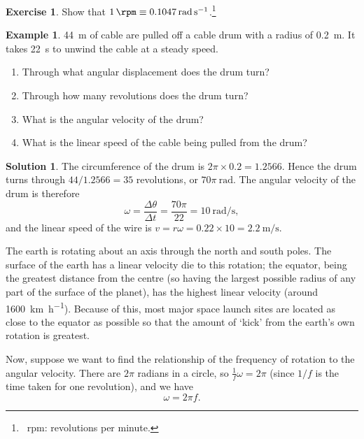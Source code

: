 \documentclass[a4paper]{amsbook}
\theoremstyle{definition}
\newtheorem*{example}{Example}
\newtheorem{exercise}{Exercise}
\numberwithin{exercise}{chapter}
\numberwithin{exercise}{chapter}
\newtheorem*{solution}{Solution}
\begin{document}
\begin{exercise}
  Show that $ \SI{1}{\rpm} \equiv \SI{0.1047}{\radian\per\second} $.\footnote{~rpm: revolutions per minute.}
\end{exercise}

\begin{example}
  \SI{44}{\metre} of cable are pulled off a cable drum with a radius of \SI{0.2}{\metre}. It takes \SI{22}{\second} to unwind
  the cable at a steady speed.
  \begin{enumerate}
    \item Through what angular displacement does the drum turn?
    \item Through how many revolutions does the drum turn?
    \item What is the angular velocity of the drum?
    \item What is the linear speed of the cable being pulled from the drum?
  \end{enumerate}
\end{example}
\begin{solution}
  The circumference of the drum is $ 2\pi \times 0.2 = 1.2566 $. Hence the drum turns through $ 44/1.2566 = 35 $ revolutions,
  or $ 70\pi~\si{\radian} $. The angular velocity of the drum is therefore
  \begin{displaymath}
    \omega = \frac{\Delta \theta}{\Delta t} = \frac{70\pi}{22} = \SI{10}{\radian\per\second},
  \end{displaymath}
  and the linear speed of the wire is $ v = r\omega = 0.22 \times 10 = \SI{2.2}{\metre\per\second} $.
\end{solution}

The earth is rotating about an axis through the north and south poles. The surface of the earth has a linear velocity die to this
rotation; the equator, being the greatest distance from the centre (so having the largest possible radius of any part of the surface
of the planet), has the highest linear velocity (around \SI{1600}{\kilo\metre\per\hour}). Because of this, most major space launch
sites are located as close to the equator as possible so that the amount of `kick' from the earth's own rotation is greatest.

Now, suppose we want to find the relationship of the frequency of rotation to the angular velocity. There are $ 2\pi $ radians
in a circle, so $ \frac{1}{f} \omega = 2\pi $ (since $ 1/f $ is the time taken for one revolution), and we have
\begin{equation}
  \omega = 2\pi f.
\end{equation}
\end{document}
